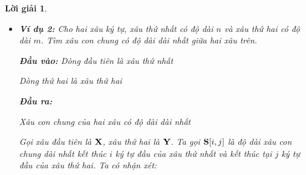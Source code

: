 \documentclass[14pt, a4paper]{article}
\theoremstyle{sltheorem}
\theoremstyle{soltheorem}
\newtheorem*{loigiai}{Lời giải}
\begin{document}
\begin{loigiai}
\begin{itemize} [label={$-$}]
        Thuật toán trên gồm 2 vòng lặp lồng nhau. Độ phức tạp tính toán của thuật toán là $O(nm)$ và độ phức tạp về bộ nhớ của thuật toán là $O(nm)$ (lưu bảng phương án hai chiều $\bold{L}$). 
        Code của thuật toán trên được trình bày ở phụ lục \ref{code-1-ex-2}

        Thực nghiệm:

        \begin{itemize}
            \item Với đầu vào:
            \begin{verbatim}
                dkfjaldfas
                djflkafdas
            \end{verbatim}
            Kết quả đầu ra:
            \begin{verbatim}
                5
            \end{verbatim}
            Thời gian chạy: 0.00011999 (giây)
            \item Với đầu vào:
            \begin{verbatim}
                ueioqurwortuwotywo
                tiuwonglsjgowtjwoot
            \end{verbatim}
            Kết quả đầu ra:
            \begin{verbatim}
                15
            \end{verbatim}
            Thời gian chạy: 0.00042899 (giây)
        \end{itemize}

        Ta nhận thấy với kích thước (độ dài xâu) tăng gấp đôi thì thời gian chạy tăng khoảng 4 lần phù hợp với độ phức tạp tính toán trong lý thuyết $O(nm)$.

        \item \textbf{Ví dụ 2:} Cho hai xâu ký tự, xâu thứ nhất có độ dài $n$ và xâu thứ hai có độ dài $m$.
        Tìm xâu con chung có độ dài dài nhất giữa hai xâu trên.

        \textbf{Đầu vào:}
        Dòng đầu tiên là xâu thứ nhất

        Dòng thứ hai là xâu thứ hai

        \textbf{Đầu ra:}

        Xâu con chung của hai xâu có độ dài dài nhất

        Gọi xâu đầu tiên là $\bold{X}$, xâu thứ hai là $\bold{Y}$.
        Ta gọi $\bold{S} \lbrack i, j \rbrack$ là độ dài xâu con chung dài nhất kết thúc $i$ ký tự đầu của xâu thứ nhất và kết thúc tại $j$ ký tự đầu của xâu thứ hai.
        Ta có nhận xét:


\end{itemize}
\end{loigiai}
\end{document}
